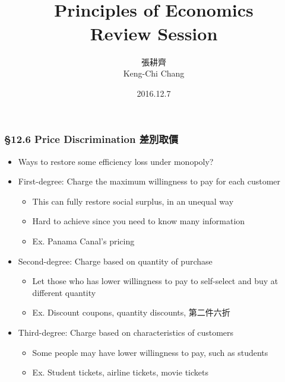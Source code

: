 \documentclass[12pt, xcolor=dvipsnames]{beamer}
\title{\bf{\Huge {}\\[-2mm] Principles of Economics \\[2mm] Review Session}}
\author{{\Large 張耕齊\\[2mm] Keng-Chi Chang}}
\institute{{}\\[-7mm]\footnotesize\tt{<r03323070@ntu.edu.tw>}\\[2mm]}
\date{\large 2016.12.7}
\begin{document}
\fontsize{12}{14pt}\selectfont

\begin{frame}
\titlepage
\end{frame}





\begin{frame}
\frametitle{\bf §12.6 Price Discrimination 差別取價}
\begin{itemize}
\item Ways to restore some efficiency loss under monopoly?
\item First-degree: Charge the maximum willingness to pay for each customer
\begin{itemize}
\item This can fully restore social surplus, in an unequal way
\item Hard to achieve since you need to know many information
\item Ex. Panama Canal's pricing
\end{itemize}
\item Second-degree: Charge based on quantity of purchase
\begin{itemize}
\item Let those who has lower willingness to pay to self-select and buy at different quantity
\item Ex. Discount coupons, quantity discounts, 第二件六折
\end{itemize}
\item Third-degree: Charge based on characteristics of customers
\begin{itemize}
\item Some people may have lower willingness to pay, such as students
\item Ex. Student tickets, airline tickets, movie tickets
\end{itemize}
\end{itemize}
\end{frame}
\end{document}
